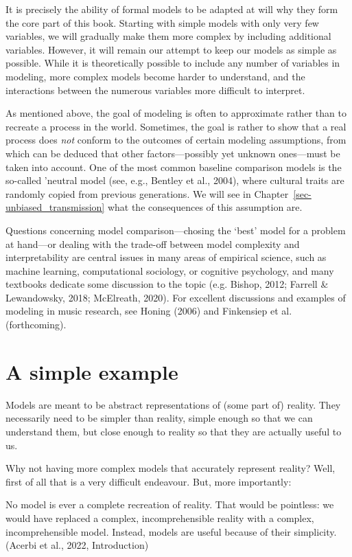 \documentclass[
  a4paperpaper,
  ,captions=tableheading
]{scrbook}
\renewenvironment{quote}{\begin{customblockquote}\list{}{\rightmargin=0em\leftmargin=0em}%
\item\relax\color{blockquote-text}\ignorespaces}{\unskip\unskip\endlist\end{customblockquote}}
\begin{document}
It is precisely the ability of formal models to be adapted at will why
they form the core part of this book. Starting with simple models with
only very few variables, we will gradually make them more complex by
including additional variables. However, it will remain our attempt to
keep our models as simple as possible. While it is theoretically
possible to include any number of variables in modeling, more complex
models become harder to understand, and the interactions between the
numerous variables more difficult to interpret.

As mentioned above, the goal of modeling is often to approximate rather
than to recreate a process in the world. Sometimes, the goal is rather
to show that a real process does \emph{not} conform to the outcomes of
certain modeling assumptions, from which can be deduced that other
factors---possibly yet unknown ones---must be taken into account. One of
the most common baseline comparison models is the so-called 'neutral
model (see, e.g., Bentley et al., 2004), where cultural traits are
randomly copied from previous generations. We will see in
Chapter~\ref{sec-unbiased_transmission} what the consequences of this
assumption are.

Questions concerning model comparison---chosing the `best' model for a
problem at hand---or dealing with the trade-off between model complexity
and interpretability are central issues in many areas of empirical
science, such as machine learning, computational sociology, or cognitive
psychology, and many textbooks dedicate some discussion to the topic
(e.g. Bishop, 2012; Farrell \& Lewandowsky, 2018; McElreath, 2020). For
excellent discussions and examples of modeling in music research, see
Honing (2006) and Finkensiep et al. (forthcoming).

\hypertarget{a-simple-example}{%
\section{A simple example}\label{a-simple-example}}

Models are meant to be abstract representations of (some part of)
reality. They necessarily need to be simpler than reality, simple enough
so that we can understand them, but close enough to reality so that they
are actually useful to us.

Why not having more complex models that accurately represent reality?
Well, first of all that is a very difficult endeavour. But, more
importantly:

\begin{quote}
No model is ever a complete recreation of reality. That would be
pointless: we would have replaced a complex, incomprehensible reality
with a complex, incomprehensible model. Instead, models are useful
because of their simplicity. (Acerbi et al., 2022, Introduction)
\end{quote}
\end{document}
